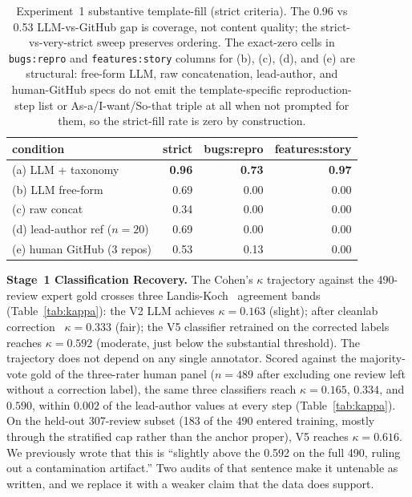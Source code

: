 \documentclass[sigconf, anonymous]{acmart}
\begin{document}
\begin{table}[t]\centering\footnotesize
  \caption{Experiment~1 substantive template-fill (strict criteria). The 0.96 vs 0.53
  LLM-vs-GitHub gap is coverage, not content quality; the strict-vs-very-strict sweep preserves
  ordering. The exact-zero cells in \texttt{bugs:repro} and \texttt{features:story} columns for
  (b), (c), (d), and (e) are structural: free-form LLM, raw concatenation, lead-author, and
  human-GitHub specs do not emit the template-specific reproduction-step list or
  As-a/I-want/So-that triple at all when not prompted for them, so the strict-fill rate is zero
  by construction.}\label{tab:stage3}
  \begin{tabular}{lrrr}
  \toprule
  condition & strict & bugs:repro & features:story \\
  \midrule
  (a) LLM + taxonomy & \textbf{0.96} & \textbf{0.73} & \textbf{0.97} \\
  (b) LLM free-form & 0.69 & 0.00 & 0.00 \\
  (c) raw concat & 0.34 & 0.00 & 0.00 \\
  (d) lead-author ref ($n=20$) & 0.69 & 0.00 & 0.00 \\
  (e) human GitHub (3 repos) & 0.53 & 0.13 & 0.00 \\
  \bottomrule
  \end{tabular}
  \end{table}

\textbf{Stage~1 Classification Recovery.} The Cohen's $\kappa$ trajectory against the 490-review expert gold crosses three Landis-Koch~\cite{landis1977measurement} agreement bands (Table~\ref{tab:kappa}): the V2 LLM achieves $\kappa = 0.163$ (slight); after cleanlab correction~\cite{northcutt2021confident} $\kappa = 0.333$ (fair); the V5 classifier retrained on the corrected labels reaches $\kappa = 0.592$ (moderate, just below the substantial threshold). The trajectory does not depend on any single annotator. Scored against the majority-vote gold of the three-rater human panel ($n = 489$ after excluding one review left without a correction label), the same three classifiers reach $\kappa = 0.165$, $0.334$, and $0.590$, within $0.002$ of the lead-author values at every step (Table~\ref{tab:kappa}). On the held-out 307-review subset (183 of the 490 entered training, mostly through the stratified
cap rather than the anchor proper), V5 reaches $\kappa = 0.616$. We previously wrote that this is
``slightly above the 0.592 on the full 490, ruling out a contamination artifact.'' Two audits of
that sentence make it untenable as written, and we replace it with a weaker claim that the data
does support.
\end{document}
